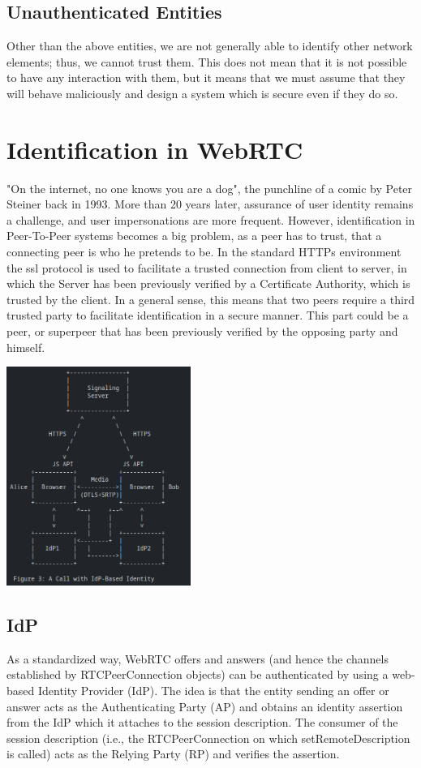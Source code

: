 \documentclass[conference]{IEEEtran}
\begin{document}
\subsection{Unauthenticated Entities}
Other than the above entities, we are not generally able to identify other network elements; thus, we cannot trust them. 
This does not mean that it is not possible to have any interaction with them, but it means that we must assume that they will 
behave maliciously and design a system which is secure even if they do so.


\section{Identification in WebRTC}
"On the internet, no one knows you are a dog", the punchline of a comic by Peter Steiner back in 1993.
More than 20 years later, assurance of user identity remains a challenge, and user impersonations are
more frequent. \cite{User_Identity_for_WebRTC_Services_A_Matter_of_Trust} However, identification in 
Peer-To-Peer systems becomes a big problem, as a peer has to trust, that a connecting peer is who he 
pretends to be. In the standard HTTPs environment the ssl
protocol is used to facilitate a trusted connection from client to server, in which the Server
has been previously verified by a Certificate Authority, which is trusted by the client. 
In a general sense, this means that two peers require a third trusted party to facilitate
identification in a secure manner.\cite{RFC8827} This part could be a peer, or superpeer that has been previously verified
by the opposing party and himself\cite{Security_Mechanisms_for_Signaling}.

\includegraphics[width=0.45\textwidth]{call with IdP Based Identity.png} %

\subsection{IdP}
As a standardized way, WebRTC offers and answers (and hence the channels established by
RTCPeerConnection objects) can be authenticated by using a web-based Identity
Provider (IdP). The idea is that the entity sending an offer or answer acts as the
Authenticating Party (AP) and obtains an identity assertion from the IdP which it
attaches to the session description. The consumer of the session description (i.e.,
the RTCPeerConnection on which setRemoteDescription is called) acts as the
Relying Party (RP) and verifies the assertion.\cite{WebRTC_Identity}
\end{document}
